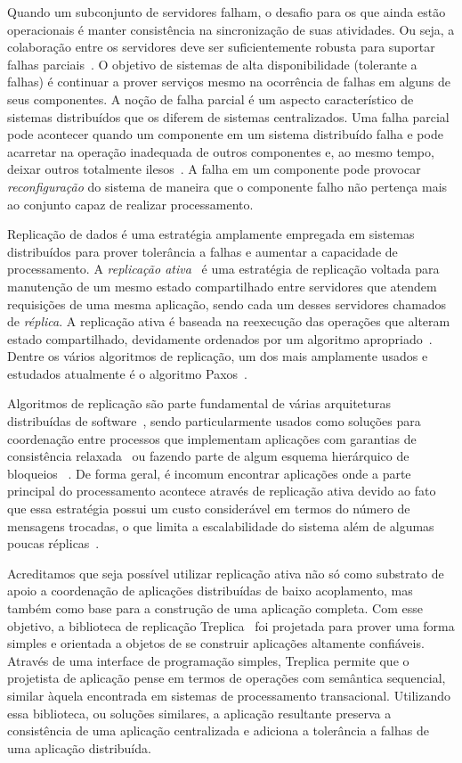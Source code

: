 Quando um subconjunto de servidores falham, o desafio para os que ainda estão
operacionais é manter consistência na sincronização de suas atividades. Ou seja, a
colaboração entre os servidores deve ser suficientemente robusta para suportar falhas
parciais~\cite{cachin11}. O objetivo de sistemas de alta disponibilidade (tolerante a
falhas) é continuar a prover serviços mesmo na ocorrência de falhas em alguns de seus
componentes. A noção de falha parcial é um aspecto característico de sistemas
distribuídos que os diferem de sistemas centralizados. Uma falha parcial pode acontecer
quando um componente em um sistema distribuído falha e pode acarretar na operação inadequada
de outros componentes e, ao mesmo tempo, deixar outros totalmente ilesos~\cite{tanenbaum07}.
A falha em um componente pode provocar \emph{reconfiguração} do sistema de maneira que o
componente falho não pertença mais ao conjunto capaz de realizar processamento.

Replicação de dados é uma estratégia amplamente empregada em sistemas distribuídos para
prover tolerância a falhas e aumentar a capacidade de processamento. A \emph{replicação
ativa}~\cite{schneider90} é uma estratégia de replicação voltada para manutenção de um mesmo
estado compartilhado entre servidores que atendem requisições de uma mesma aplicação,
sendo cada um desses servidores chamados de \emph{réplica}. A replicação ativa é baseada
na reexecução das operações que alteram estado compartilhado, devidamente ordenados por um
algoritmo apropriado~\cite{schneider90}. Dentre os vários algoritmos de replicação, um dos
mais amplamente usados e estudados atualmente é o algoritmo Paxos~\cite{lamport98}.

Algoritmos de replicação são parte fundamental de várias arquiteturas distribuídas de
software~\cite{chandra07,  hupfeld08b, maccormick04}, sendo particularmente usados como
soluções para coordenação entre processos que implementam aplicações com garantias de
consistência relaxada~\cite{burrows06} ou fazendo parte de algum esquema hierárquico de
bloqueios ~\cite{lampson96}. De forma geral, é incomum encontrar aplicações onde a parte
principal do processamento acontece através de replicação ativa devido ao fato que essa
estratégia possui um custo considerável em termos do número de mensagens trocadas, o que
limita a escalabilidade do sistema além de algumas poucas réplicas~\cite{lampson96}.

Acreditamos que seja possível utilizar replicação ativa não só como substrato de apoio a
coordenação de aplicações distribuídas de baixo acoplamento, mas também como base para a
construção de uma aplicação completa. Com esse objetivo, a biblioteca de replicação
Treplica~\cite{vieira08a, vieira-tr10b} foi projetada para prover uma forma simples e
orientada a objetos de se construir aplicações altamente confiáveis. Através de uma
interface de programação simples, Treplica permite que o projetista de aplicação pense em
termos de operações com semântica sequencial, similar àquela encontrada em sistemas de
processamento transacional. Utilizando essa biblioteca, ou soluções similares, a aplicação
resultante preserva a consistência de uma aplicação centralizada e adiciona a tolerância a
falhas de uma aplicação distribuída.

